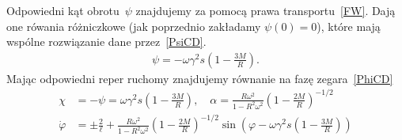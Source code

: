 Odpowiedni kąt obrotu~$\psi$ znajdujemy za pomocą prawa transportu~\eqref{FW}.
Dają one rówania różniczkowe (jak poprzednio zakładamy $\psi(0)=0$), 
które mają wspólne rozwiązanie dane przez~\eqref{PsiCD}.
\begin{align}\label{PsiCD}
\psi = - \omega \gamma^2 s \left( 1-\frac{3M}{R} \right).
\end{align}
Mając odpowiedni reper ruchomy znajdujemy równanie na 
fazę zegara~\eqref{PhiCD}
\begin{align}\nonumber
\chi &= - \psi =\omega \gamma^2 s \left( 1-\frac{3M}{R} \right)
 , \quad 
\alpha =  \frac{R\omega^2}{1-R^2\omega^2} 
\left( 1-\frac{2M}{R} \right)^{-1/2}
\\
\dot{\varphi} &= \pm \frac{2}{\ell} + \label{PsiCD}
\frac{R\omega^2}{1-R^2\omega^2} 
\left( 1-\frac{2M}{R} \right)^{-1/2}\sin \left(\varphi - 
\omega \gamma^2 s \left( 1-\frac{3M}{R} \right)
 \right)
\end{align}











